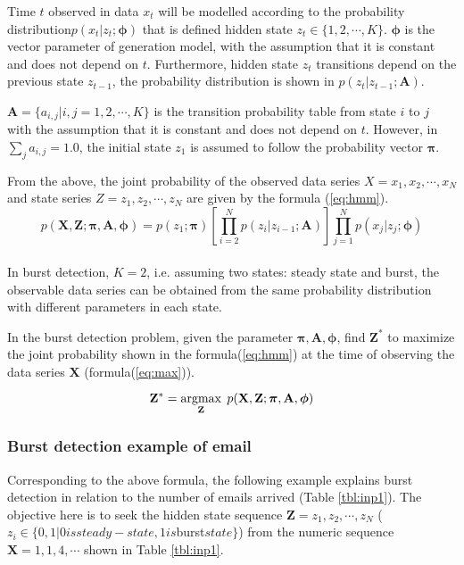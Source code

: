 Time $t$ observed in data $x_t$  will be modelled according to the probability distribution$p(x_t|z_t;\boldsymbol{\phi})$ 
that is defined hidden state $z_t\in \{1,2,\cdots,K\}$.
$\boldsymbol{\phi}$ is the vector parameter of generation model, with the assumption that it is constant and does not depend on $t$.
Furthermore, hidden state $z_t$ transitions depend on the previous state $z_{t-1}$, the probability distribution is shown in $p(z_t|z_{t-1};\mathbf{A})$.

$\mathbf{A}=\{a_{i,j}|i,j=1,2,\cdots,K\}$ is the transition probability table from state $i$ to $j$ with the assumption that it is constant and does not depend on $t$.
However, in $\sum_j a_{i,j}=1.0$, the initial state $z_1$ is assumed to follow the probability vector $\boldsymbol{\pi}$.

From the above, the joint probability of the observed data series $X=x_1,x_2,\cdots,x_N$ and state series $Z=z_1,z_2,\cdots,z_N$ are given by the formula (\ref{eq:hmm}).\cite{Bishop2008}
%
{\footnotesize
\begin{equation}
p(\mathbf{X},\mathbf{Z};\boldsymbol{\pi},\mathbf{A},\boldsymbol{\phi})=p(z_1;\boldsymbol{\pi})
\left[\prod_{i=2}^N p(z_i|z_{i-1};\mathbf{A})\right]
\prod_{j=1}^N p(x_j|z_j;\boldsymbol{\phi})
\label{eq:hmm}
\end{equation}
}\\
In burst detection, $K=2$, i.e. assuming two states: steady state and burst, the observable data series can be obtained from the same probability distribution with different parameters in each state.

In the burst detection problem, given the parameter $\boldsymbol{\pi},\mathbf{A},\boldsymbol{\phi}$, find $\mathbf{Z}^*$ to maximize the joint probability shown in the formula(\ref{eq:hmm}) at the time of observing the data series $\mathbf{X}$ (formula(\ref{eq:max})).

\begin{equation}
\mathbf{Z}^*=\mathop{\rm argmax}\limits_{\mathbf{Z}}\; p(\mathbf{X},\mathbf{Z};\boldsymbol{\pi},\mathbf{A},\boldsymbol{\phi})
\label{eq:max}
\end{equation}


\subsubsection*{Burst detection example of email}
Corresponding to the above formula, the following example explains burst detection in relation to the number of emails arrived (Table \ref{tbl:inp1}).
The objective here is to seek the hidden state sequence $\mathbf{Z}=z_1,z_2,\cdots,z_N$ ($z_i \in \{0,1|0 is steady-state,1 is $burst$state\}$) from the numeric sequence $\mathbf{X}=1,1,4,\cdots$ shown in Table \ref{tbl:inp1}.

